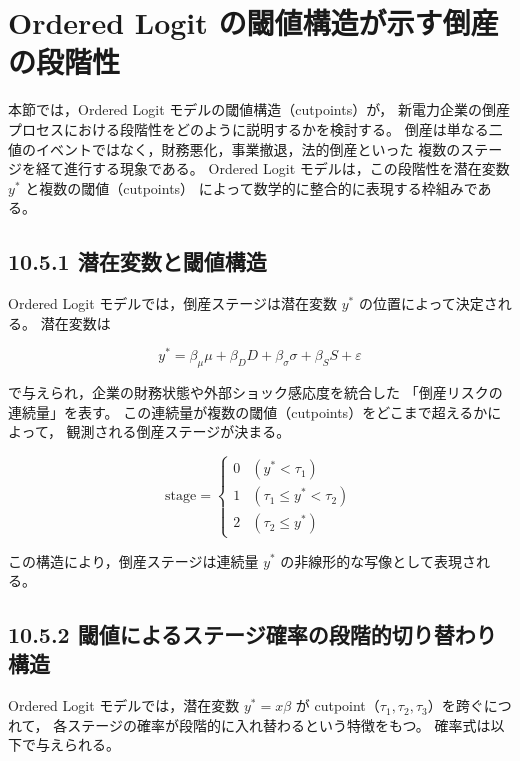 
\section{Ordered Logit の閾値構造が示す倒産の段階性}

本節では，Ordered Logit モデルの閾値構造（cutpoints）が，
新電力企業の倒産プロセスにおける段階性をどのように説明するかを検討する。
倒産は単なる二値のイベントではなく，財務悪化，事業撤退，法的倒産といった
複数のステージを経て進行する現象である。
Ordered Logit モデルは，この段階性を潜在変数 $y^*$ と複数の閾値（cutpoints）
によって数学的に整合的に表現する枠組みである。

\subsection*{10.5.1 潜在変数と閾値構造}

Ordered Logit モデルでは，倒産ステージは潜在変数 $y^*$ の位置によって決定される。
潜在変数は



\[
y^* = \beta_\mu \mu + \beta_D D + \beta_\sigma \sigma + \beta_S S + \varepsilon
\]



で与えられ，企業の財務状態や外部ショック感応度を統合した
「倒産リスクの連続量」を表す。
この連続量が複数の閾値（cutpoints）をどこまで超えるかによって，
観測される倒産ステージが決まる。



\[
\text{stage} =
\begin{cases}
0 & (y^* < \tau_1) \\
1 & (\tau_1 \le y^* < \tau_2) \\
2 & (\tau_2 \le y^*)
\end{cases}
\]



この構造により，倒産ステージは連続量 $y^*$ の非線形的な写像として表現される。

\subsection*{10.5.2 閾値によるステージ確率の段階的切り替わり構造}

Ordered Logit モデルでは，潜在変数 $y^* = x\beta$ が
cutpoint（$\tau_1, \tau_2, \tau_3$）を跨ぐにつれて，
各ステージの確率が段階的に入れ替わるという特徴をもつ。
確率式は以下で与えられる。



